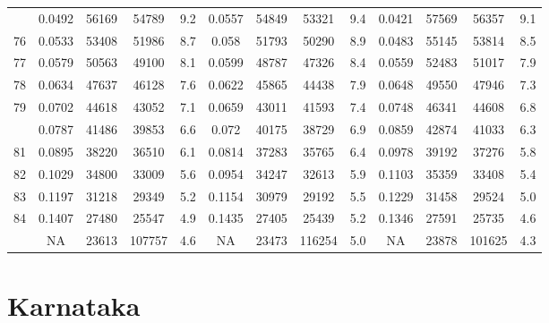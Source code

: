 \documentclass[
  14pt,
]{article}
\begin{document}
\begin{longtable}[t]{lcccccccccccc}
\addlinespace
75 & 0.0492 & 56169 & 54789 & 9.2 & 0.0557 & 54849 & 53321 & 9.4 & 0.0421 & 57569 & 56357 & 9.1\\
76 & 0.0533 & 53408 & 51986 & 8.7 & 0.058 & 51793 & 50290 & 8.9 & 0.0483 & 55145 & 53814 & 8.5\\
77 & 0.0579 & 50563 & 49100 & 8.1 & 0.0599 & 48787 & 47326 & 8.4 & 0.0559 & 52483 & 51017 & 7.9\\
78 & 0.0634 & 47637 & 46128 & 7.6 & 0.0622 & 45865 & 44438 & 7.9 & 0.0648 & 49550 & 47946 & 7.3\\
79 & 0.0702 & 44618 & 43052 & 7.1 & 0.0659 & 43011 & 41593 & 7.4 & 0.0748 & 46341 & 44608 & 6.8\\
\addlinespace
80 & 0.0787 & 41486 & 39853 & 6.6 & 0.072 & 40175 & 38729 & 6.9 & 0.0859 & 42874 & 41033 & 6.3\\
81 & 0.0895 & 38220 & 36510 & 6.1 & 0.0814 & 37283 & 35765 & 6.4 & 0.0978 & 39192 & 37276 & 5.8\\
82 & 0.1029 & 34800 & 33009 & 5.6 & 0.0954 & 34247 & 32613 & 5.9 & 0.1103 & 35359 & 33408 & 5.4\\
83 & 0.1197 & 31218 & 29349 & 5.2 & 0.1154 & 30979 & 29192 & 5.5 & 0.1229 & 31458 & 29524 & 5.0\\
84 & 0.1407 & 27480 & 25547 & 4.9 & 0.1435 & 27405 & 25439 & 5.2 & 0.1346 & 27591 & 25735 & 4.6\\
\addlinespace
85 & NA & 23613 & 107757 & 4.6 & NA & 23473 & 116254 & 5.0 & NA & 23878 & 101625 & 4.3\\*
\end{longtable}

\pagebreak

\hypertarget{karnataka}{%
\section{Karnataka}\label{karnataka}}
\end{document}
